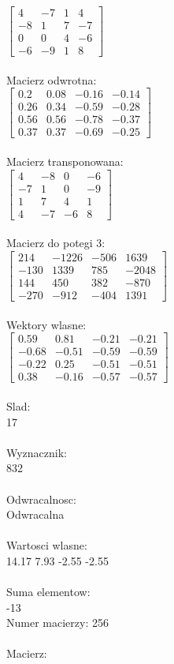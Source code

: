 \documentclass[a4paper,12pt]{article}
\begin{document}
$\begin{bmatrix} 4&-7&1&4\\-8&1&7&-7\\0&0&4&-6\\-6&-9&1&8 \end{bmatrix}$
\\
\\
Macierz odwrotna:\\

$\begin{bmatrix} 0.2&0.08&-0.16&-0.14\\0.26&0.34&-0.59&-0.28\\0.56&0.56&-0.78&-0.37\\0.37&0.37&-0.69&-0.25 \end{bmatrix}$
\\
\\
Macierz transponowana:\\

$\begin{bmatrix} 4&-8&0&-6\\-7&1&0&-9\\1&7&4&1\\4&-7&-6&8 \end{bmatrix}$
\\
\\
Macierz do potegi 3:\\

$\begin{bmatrix} 214&-1226&-506&1639\\-130&1339&785&-2048\\144&450&382&-870\\-270&-912&-404&1391 \end{bmatrix}$
\\
\\
Wektory wlasne:\\

$\begin{bmatrix} 0.59&0.81&-0.21&-0.21\\-0.68&-0.51&-0.59&-0.59\\-0.22&0.25&-0.51&-0.51\\0.38&-0.16&-0.57&-0.57 \end{bmatrix}$
\\
\\
Slad:\\
17
\\
\\
Wyznacznik:\\
832
\\
\\
Odwracalnosc:\\
Odwracalna
\\
\\
Wartosci wlasne:\\
14.17 7.93 -2.55 -2.55
\\
\\
Suma elementow:\\
-13
\\
\newpage
Numer macierzy:
256
\\
\\
Macierz:\\
\end{document}
